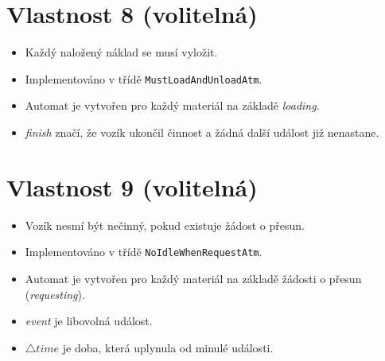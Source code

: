 \documentclass[a4paper, 11pt, fleqn]{scrartcl}
\begin{document}
  \vspace*{-1em}

  \section*{Vlastnost 8 (volitelná)}
    \begin{itemize}[noitemsep]
      \item Každý naložený náklad se musí vyložit.
      \item Implementováno v třídě \texttt{MustLoadAndUnloadAtm}.
      \item Automat je vytvořen pro každý materiál na základě \textit{loading}.
      \item \textit{finish} značí, že vozík ukončil činnost a žádná další událost již nenastane.
    \end{itemize}

    \vspace*{-1em}

    \begin{figure}[!h]
      \centering
    \end{figure}

    \vspace*{-2em}

  \section*{Vlastnost 9 (volitelná)}
    \begin{itemize}[noitemsep]
      \item Vozík nesmí být nečinný, pokud existuje žádost o přesun.
      \item Implementováno v třídě \texttt{NoIdleWhenRequestAtm}.
      \item Automat je vytvořen pro každý materiál na základě žádosti o přesun (\textit{requesting}).
      \item \textit{event} je libovolná událost.
      \item $\triangle time$ je doba, která uplynula od minulé události.
    \end{itemize}
\end{document}

